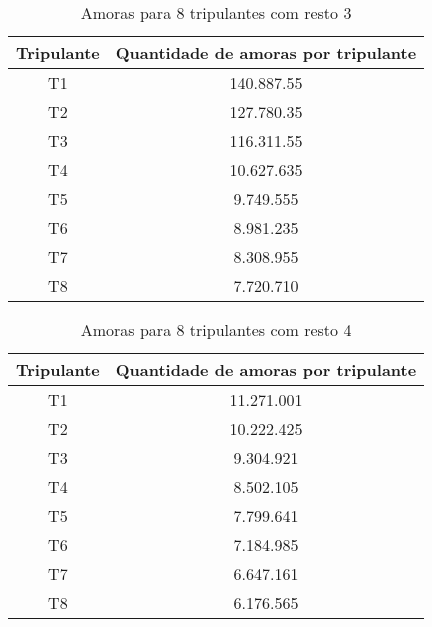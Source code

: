 \documentclass[12pt]{article}
\begin{document}
\begin{table}[H]

\centering

\begin{tabular}{|c|c|}

\hline
Tripulante & Quantidade de amoras por tripulante \\
\hline
T1 & 140.887.55 \\
\hline
T2 & 127.780.35 \\
\hline
T3 & 116.311.55 \\
\hline
T4 & 10.627.635 \\
\hline
T5 & 9.749.555 \\
\hline
T6 & 8.981.235 \\
\hline
T7 & 8.308.955 \\
\hline
T8 & 7.720.710 \\
\hline

\end{tabular}
\label{Tabela7}
\caption{Amoras para 8 tripulantes com resto 3}

\end{table}

\begin{table}[H]

\centering

\begin{tabular}{|c|c|}

\hline
Tripulante & Quantidade de amoras por tripulante \\
\hline
T1 & 11.271.001 \\
\hline
T2 & 10.222.425 \\
\hline
T3 & 9.304.921 \\
\hline
T4 & 8.502.105 \\
\hline
T5 & 7.799.641 \\
\hline
T6 & 7.184.985 \\
\hline
T7 & 6.647.161 \\
\hline
T8 & 6.176.565 \\
\hline

\end{tabular}
\label{Tabela8}
\caption{Amoras para 8 tripulantes com resto 4}

\end{table}
\end{document}

